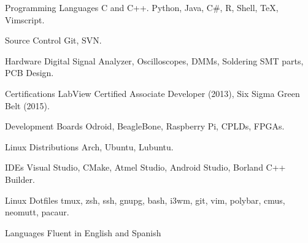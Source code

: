 
\begin{cvskills}


	\cvskill
		{Programming Languages}
			{C and C++. Python, Java, C\#, R, Shell, \TeX, Vimscript.}

	\cvskill
		{Source Control}
			{Git, SVN.}

	\cvskill
		{Hardware}
			{Digital Signal Analyzer, Oscilloscopes, DMMs, Soldering SMT parts, PCB Design.}

	\cvskill
		{Certifications}
			{LabView Certified Associate Developer (2013), Six Sigma Green Belt (2015).}

	\cvskill
		{Development Boards}
			{Odroid, BeagleBone, Raspberry Pi, CPLDs, FPGAs.}

	\cvskill
		{Linux Distributions}
			{Arch, Ubuntu, Lubuntu.}

	\cvskill
		{IDEs}
			{Visual Studio, CMake, Atmel Studio, Android Studio, Borland C++ Builder.}

	\cvskill
		{Linux Dotfiles}
			{tmux, zsh, ssh, gnupg, bash, i3wm, git, vim, polybar, cmus, neomutt, pacaur.}

	\cvskill
		{Languages}
			{Fluent in English and Spanish}

\end{cvskills}
